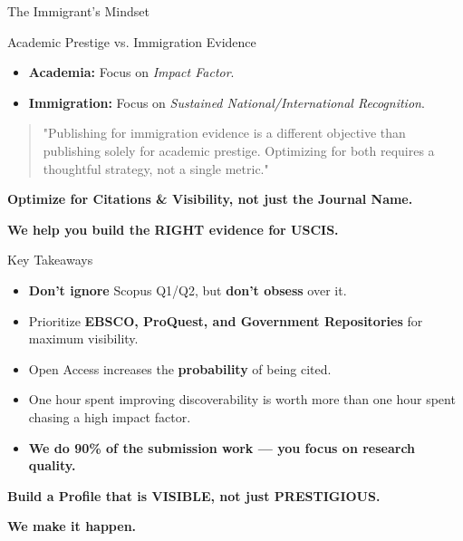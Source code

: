 \documentclass[10pt, aspectratio=169]{beamer}
\begin{document}
	\begin{frame}{The Immigrant's Mindset}
		\begin{block}{Academic Prestige vs. Immigration Evidence}
			\begin{itemize}
				\item \textbf{Academia:} Focus on \textit{Impact Factor}.
				\item \textbf{Immigration:} Focus on \textit{Sustained National/International Recognition}.
			\end{itemize}
		\end{block}
		\vspace{0.5cm}
		\begin{quote}
			"Publishing for immigration evidence is a different objective than publishing solely for academic prestige. Optimizing for both requires a thoughtful strategy, not a single metric."
		\end{quote}
		\vspace{0.5cm}
		\begin{center}
			\textbf{Optimize for Citations \& Visibility, not just the Journal Name.}
			
			\vspace{0.3cm}
			\textcolor{myblue}{\textbf{We help you build the RIGHT evidence for USCIS.}}
		\end{center}
	\end{frame}
	
	\begin{frame}{Key Takeaways}
		\begin{itemize}
			\item \textbf{Don't ignore} Scopus Q1/Q2, but \textbf{don't obsess} over it.
			\item Prioritize \textbf{EBSCO, ProQuest, and Government Repositories} for maximum visibility.
			\item Open Access increases the \textbf{probability} of being cited.
			\item One hour spent improving discoverability is worth more than one hour spent chasing a high impact factor.
			\item \textcolor{myblue}{\textbf{We do 90\% of the submission work — you focus on research quality.}}
		\end{itemize}
		\vspace{0.5cm}
		\begin{center}
			\textcolor{myblue}{\Large \textbf{Build a Profile that is VISIBLE, not just PRESTIGIOUS.}}
			
			\vspace{0.2cm}
			\textcolor{myorange}{\textbf{We make it happen.}}
		\end{center}
	\end{frame}
	
\end{document}
